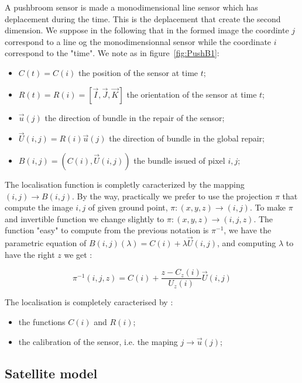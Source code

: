 A pushbroom sensor is made a monodimensional line sensor which has deplacement during the time.
This is the deplacement that create the second dimension. We suppose in the following  that in the
formed  image the coordinte $j$ correspond to a line og the monodimensionnal sensor while the coordinate
$i$ correspond to the "time". We note as in figure~\ref{fig:PushB1}:

\begin{itemize}
	\item  $C(t)=C(i)$ the position of the sensor at time $t$;
	\item  $R(t)=R(i)=[\vec{I},\vec{J},\vec{K}]$ the orientation of the sensor at time $t$;
	\item  $\vec{u}(j)$ the direction of bundle in the repair of the sensor;
	\item  $\vec{U}(i,j) = R(i)\vec{u}(j)$ the direction of bundle in the global repair;
	\item  $B(i,j)= (C(i),\vec{U}(i,j))$ the bundle issued of pixel $i,j$;
\end{itemize}

The localisation function is completly caracterized by the mapping $(i,j) \rightarrow B(i,j)$.
By the way, practically we prefer to use the projection $\pi$ that  compute the 
image $i,j$ of given ground point, $\pi : (x,y,z) \rightarrow (i,j)$.  To make
$\pi$ and invertible function we change slightly to $\pi : (x,y,z) \rightarrow (i,j,z)$.
The function "easy" to compute from the previous notation is $\pi^{-1}$,
we have the parametric equation of $B(i,j)(\lambda) = C(i) + \lambda \vec{U}(i,j)$,
and computing $\lambda$  to have the right $z$ we get :

\begin{equation}
	\pi^{-1}(i,j,z) = C(i) + \frac{z-C_z(i)}{U_z(i)} \vec{U}(i,j)
\end{equation}

The localisation is completely caracterised by :

\begin{itemize}
	\item  the functions $C(i)$ and $R(i)$;
	\item  the calibration of the sensor, i.e. the maping $j \rightarrow \vec{u}(j)$;
\end{itemize}


\subsection{Satellite model}

